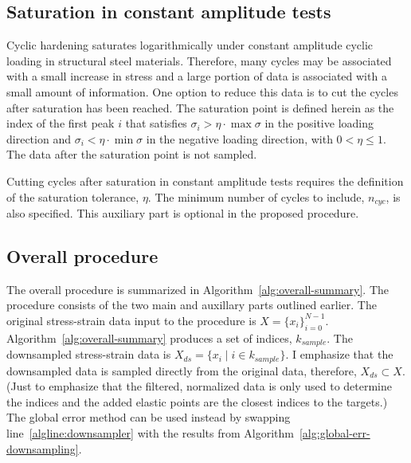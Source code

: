 \documentclass[a4paper,11pt]{article}
\begin{document}
\subsection{Saturation in constant amplitude tests}

Cyclic hardening saturates logarithmically under constant amplitude cyclic loading in structural steel materials.
Therefore, many cycles may be associated with a small increase in stress and a large portion of data is associated with a small amount of information.
One option to reduce this data is to cut the cycles after saturation has been reached.
The saturation point is defined herein as the index of the first peak $i$ that satisfies $\sigma_i > \eta \cdot \max \sigma$ in the positive loading direction and $\sigma_i < \eta \cdot \min \sigma$ in the negative loading direction, with $0 < \eta \leq 1$.
The data after the saturation point is not sampled.

Cutting cycles after saturation in constant amplitude tests requires the definition of the saturation tolerance, $\eta$.
The minimum number of cycles to include, $n_{cyc}$, is also specified.
This auxiliary part is optional in the proposed procedure.


\subsection{Overall procedure}
\label{sec:overall-procedure}

The overall procedure is summarized in Algorithm~\ref{alg:overall-summary}.
The procedure consists of the two main and auxillary parts outlined earlier.
The original stress-strain data input to the procedure is $X = \{x_i \}_{i=0}^{N-1}$.
Algorithm~\ref{alg:overall-summary} produces a set of indices, $k_{sample}$.
The downsampled stress-strain data is $X_{ds} = \{ x_i \mid i \in k_{sample} \}$.
I emphasize that the downsampled data is sampled directly from the original data, therefore, $X_{ds} \subset X$.
(Just to emphasize that the filtered, normalized data is only used to determine the indices and the added elastic points are the closest indices to the targets.)
The global error method can be used instead by swapping line~\ref{algline:downsampler} with the results from Algorithm~\ref{alg:global-err-downsampling}.
\end{document}
